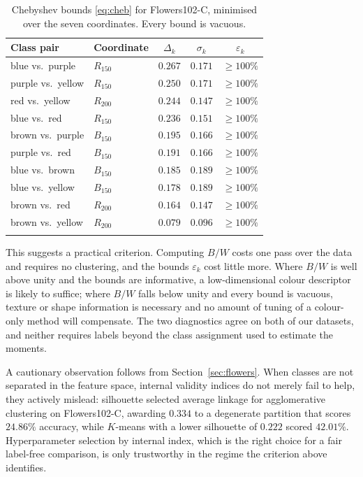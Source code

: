 \documentclass[pdflatex,sn-basic]{sn-jnl}
\theoremstyle{thmstyleone}%
\theoremstyle{thmstyletwo}%
\theoremstyle{thmstylethree}%
\begin{document}
\begin{table}[h]
\centering
\caption{Chebyshev bounds \eqref{eq:cheb} for Flowers102-C, minimised over the
seven coordinates. Every bound is vacuous.}\label{tab:flowers-cheb}
\begin{tabular}{@{}llccc@{}}
\toprule
Class pair & Coordinate & $\Delta_k$ & $\sigma_k$ & $\varepsilon_k$ \\
\midrule
blue vs.\ purple   & $R_{150}$ & $0.267$ & $0.171$ & $\ge 100\%$ \\
purple vs.\ yellow & $R_{150}$ & $0.250$ & $0.171$ & $\ge 100\%$ \\
red vs.\ yellow    & $R_{200}$ & $0.244$ & $0.147$ & $\ge 100\%$ \\
blue vs.\ red      & $R_{150}$ & $0.236$ & $0.151$ & $\ge 100\%$ \\
brown vs.\ purple  & $B_{150}$ & $0.195$ & $0.166$ & $\ge 100\%$ \\
purple vs.\ red    & $B_{150}$ & $0.191$ & $0.166$ & $\ge 100\%$ \\
blue vs.\ brown    & $B_{150}$ & $0.185$ & $0.189$ & $\ge 100\%$ \\
blue vs.\ yellow   & $B_{150}$ & $0.178$ & $0.189$ & $\ge 100\%$ \\
brown vs.\ red     & $R_{200}$ & $0.164$ & $0.147$ & $\ge 100\%$ \\
brown vs.\ yellow  & $R_{200}$ & $0.079$ & $0.096$ & $\ge 100\%$ \\
\botrule
\end{tabular}
\end{table}

This suggests a practical criterion. Computing $B/W$ costs one pass over the
data and requires no clustering, and the bounds $\varepsilon_k$ cost little
more. Where $B/W$ is well above unity and the bounds are informative, a
low-dimensional colour descriptor is likely to suffice; where $B/W$ falls below
unity and every bound is vacuous, texture or shape information is necessary and
no amount of tuning of a colour-only method will compensate. The two
diagnostics agree on both of our datasets, and neither requires labels beyond
the class assignment used to estimate the moments.

A cautionary observation follows from Section~\ref{sec:flowers}. When classes
are not separated in the feature space, internal validity indices do not merely
fail to help, they actively mislead: silhouette selected average linkage for
agglomerative clustering on Flowers102-C, awarding $0.334$ to a degenerate
partition that scores $24.86\%$ accuracy, while $K$-means with a lower
silhouette of $0.222$ scored $42.01\%$. Hyperparameter selection by internal
index, which is the right choice for a fair label-free comparison, is only
trustworthy in the regime the criterion above identifies.
\end{document}
